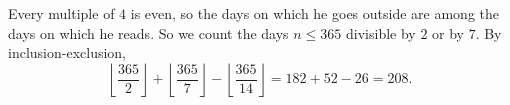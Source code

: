 Every multiple of $4$ is even, so the days on which he goes outside are among the days on which he reads. So we count the days $n\le365$ divisible by $2$ or by $7$. By inclusion-exclusion,
\[\left\lfloor\dfrac{365}{2}\right\rfloor+\left\lfloor\dfrac{365}{7}\right\rfloor-\left\lfloor\dfrac{365}{14}\right\rfloor=182+52-26=\boxed{208}.\]
